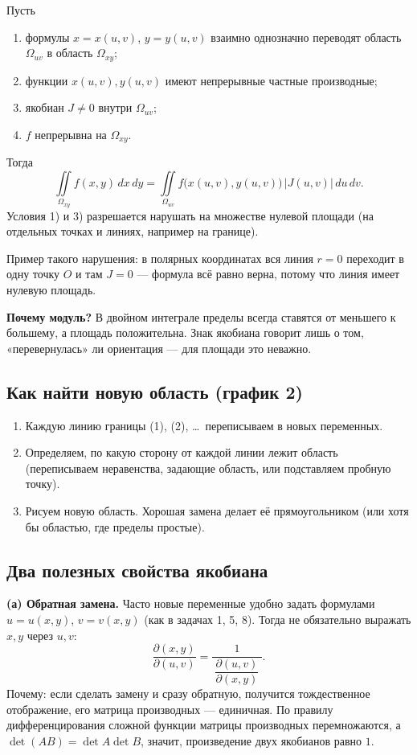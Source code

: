 \begin{thmbox}
Пусть
\begin{enumerate}[label=\arabic*)]
\item формулы $x=x(u,v)$, $y=y(u,v)$ взаимно однозначно переводят область $\Omega_{uv}$ в область $\Omega_{xy}$;
\item функции $x(u,v),y(u,v)$ имеют непрерывные частные производные;
\item якобиан $J\neq0$ внутри $\Omega_{uv}$;
\item $f$ непрерывна на $\Omega_{xy}$.
\end{enumerate}
Тогда
\[
\boxed{\ \iint\limits_{\Omega_{xy}} f(x,y)\,dx\,dy=\iint\limits_{\Omega_{uv}} f\bigl(x(u,v),y(u,v)\bigr)\,|J(u,v)|\,du\,dv.\ }
\]
Условия 1) и 3) разрешается нарушать на множестве нулевой площади (на отдельных точках и линиях, например на границе).
\end{thmbox}

Пример такого нарушения: в полярных координатах вся линия $r=0$ переходит в одну точку $O$ и там $J=0$ --- формула всё равно верна, потому что линия имеет нулевую площадь.

\textbf{Почему модуль?} В двойном интеграле пределы всегда ставятся от меньшего к большему, а площадь положительна. Знак якобиана говорит лишь о том, «перевернулась» ли ориентация --- для площади это неважно.

\subsection{Как найти новую область (график 2)}
\begin{enumerate}[label=\arabic*)]
\item Каждую линию границы (1), (2), \dots\ переписываем в новых переменных.
\item Определяем, по какую сторону от каждой линии лежит область (переписываем неравенства, задающие область, или подставляем пробную точку).
\item Рисуем новую область. Хорошая замена делает её прямоугольником (или хотя бы областью, где пределы простые).
\end{enumerate}

\subsection{Два полезных свойства якобиана}
\textbf{(а) Обратная замена.} Часто новые переменные удобно задать формулами $u=u(x,y)$, $v=v(x,y)$ (как в задачах 1, 5, 8). Тогда не обязательно выражать $x,y$ через $u,v$:
\[
\frac{\partial(x,y)}{\partial(u,v)}=\frac{1}{\ \dfrac{\partial(u,v)}{\partial(x,y)}\ } .
\]
Почему: если сделать замену и сразу обратную, получится тождественное отображение, его матрица производных --- единичная. По правилу дифференцирования сложной функции матрицы производных перемножаются, а $\det(AB)=\det A\det B$, значит, произведение двух якобианов равно $1$.

